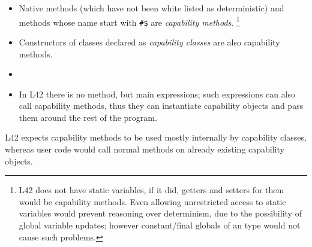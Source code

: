 \begin{itemize}
\item Native methods (which have not been white listed as deterministic) and methods whose name start with \texttt{\#\$} are \emph{capability methods}.%
\footnote{
L42 does not have static variables, if it did, getters and setters for them would be capability methods.
Even allowing unrestricted access to \Q@imm@
static variables would prevent reasoning over
determinism, due to the possibility of global variable
updates; however constant/final globals of an 
\Q@imm@ type would not cause such problems.
}
\item Constructors of classes declared as \emph{capability classes} are also capability methods.
\item {}
\item In L42 there is no \Q@main@ method, but main expressions; such expressions can also call capability methods, thus they can instantiate capability objects and pass them around the rest of the program.

\end{itemize}
L42 expects capability methods to be used mostly internally by capability classes, whereas user code would call normal methods on already existing capability objects.


